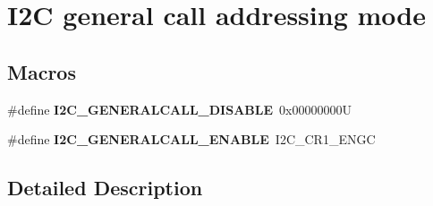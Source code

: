 \hypertarget{group___i2_c__general__call__addressing__mode}{}\section{I2C general call addressing mode}
\label{group___i2_c__general__call__addressing__mode}
\subsection*{Macros}
\begin{DoxyCompactItemize}
\item 
\mbox{\label{group___i2_c__general__call__addressing__mode_ga14918ea7d2b23cd67c66b49ebbf5c0a8}} 
\#define {\bfseries I2\+C\+\_\+\+G\+E\+N\+E\+R\+A\+L\+C\+A\+L\+L\+\_\+\+D\+I\+S\+A\+B\+LE}~0x00000000U
\item 
\mbox{\label{group___i2_c__general__call__addressing__mode_ga5ec9ec869e4c78a597c5007c245c01a0}} 
\#define {\bfseries I2\+C\+\_\+\+G\+E\+N\+E\+R\+A\+L\+C\+A\+L\+L\+\_\+\+E\+N\+A\+B\+LE}~I2\+C\+\_\+\+C\+R1\+\_\+\+E\+N\+GC
\end{DoxyCompactItemize}


\subsection{Detailed Description}
